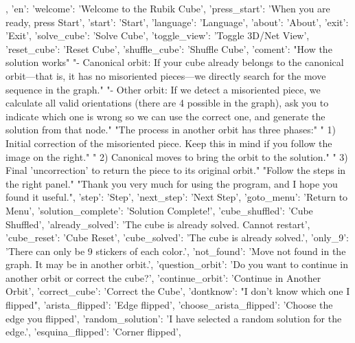 {{    },
    'en': {
        'welcome':         'Welcome to the Rubik Cube',
        'press_start':     'When you are ready, press Start',
        'start':           'Start',
        'language':        'Language',
        'about':           'About',
        'exit':            'Exit',
        'solve_cube':      'Solve Cube',
        'toggle_view':     'Toggle 3D/Net View',
        'reset_cube':      'Reset Cube',
        'shuffle_cube':    'Shuffle Cube',
        'coment':          "How the solution works\n\n"
                            "- Canonical orbit: If your cube already belongs to the canonical orbit—that is, it has no misoriented pieces—we directly search for the move sequence in the graph.\n"
                            "- Other orbit: If we detect a misoriented piece, we calculate all valid orientations (there are 4 possible in the graph), ask you to indicate which one is wrong so we can use the correct one, and generate the solution from that node.\n\n"
                            "The process in another orbit has three phases:\n"
                            "  1) Initial correction of the misoriented piece. Keep this in mind if you follow the image on the right.\n"
                            "  2) Canonical moves to bring the orbit to the solution.\n"
                            "  3) Final 'uncorrection' to return the piece to its original orbit.\n\n"
                            "Follow the steps in the right panel.\n\n"
                            "Thank you very much for using the program, and I hope you found it useful.\n\n",
        'step':          'Step',
        'next_step':       'Next Step',
        'goto_menu':       'Return to Menu',
        'solution_complete': 'Solution Complete!',
        'cube_shuffled':   'Cube Shuffled',
        'already_solved':  'The cube is already solved. Cannot restart',
        'cube_reset':      'Cube Reset',
        'cube_solved':     'The cube is already solved.',
        'only_9':          'There can only be 9 stickers of each color.',
        'not_found':       'Move not found in the graph. It may be in another orbit.',
        'question_orbit':  'Do you want to continue in another orbit or correct the cube?',
        'continue_orbit':  'Continue in Another Orbit',
        'correct_cube':    'Correct the Cube',
        'dontknow':        "I don’t know which one I flipped",  
        'arista_flipped':  'Edge flipped',
        'choose_arista_flipped': 'Choose the edge you flipped',
        'random_solution': 'I have selected a random solution for the edge.',
        'esquina_flipped': 'Corner flipped',
}}
